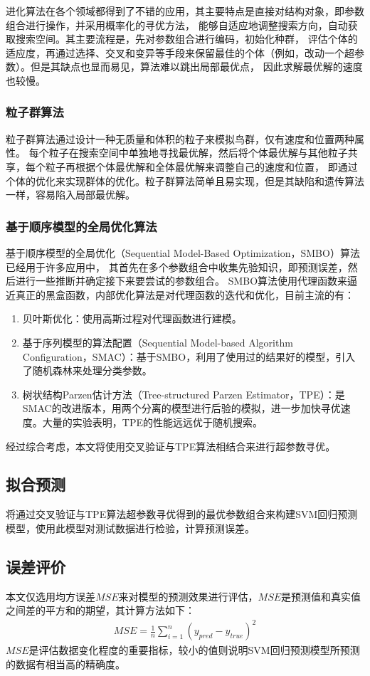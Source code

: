 进化算法在各个领域都得到了不错的应用，其主要特点是直接对结构对象，即参数组合进行操作，并采用概率化的寻优方法，
能够自适应地调整搜索方向，自动获取搜索空间。其主要流程是，先对参数组合进行编码，初始化种群，
评估个体的适应度，再通过选择、交叉和变异等手段来保留最佳的个体（例如，改动一个超参数）。但是其缺点也显而易见，算法难以跳出局部最优点，
因此求解最优解的速度也较慢。

\subsubsection{粒子群算法}

粒子群算法通过设计一种无质量和体积的粒子来模拟鸟群，仅有速度和位置两种属性。
每个粒子在搜索空间中单独地寻找最优解，然后将个体最优解与其他粒子共享，每个粒子再根据个体最优解和全体最优解来调整自己的速度和位置，
即通过个体的优化来实现群体的优化。粒子群算法简单且易实现，但是其缺陷和遗传算法一样，容易陷入局部最优解。

\subsubsection{基于顺序模型的全局优化算法}

基于顺序模型的全局优化（Sequential Model-Based Optimization，SMBO）算法已经用于许多应用中，
其首先在多个参数组合中收集先验知识，即预测误差，然后进行一些推断并确定接下来要尝试的参数组合。
SMBO算法使用代理函数来逼近真正的黑盒函数，内部优化算法是对代理函数的迭代和优化，目前主流的有：
\begin{enumerate}
    \item 贝叶斯优化：使用高斯过程对代理函数进行建模。
    \item 基于序列模型的算法配置（Sequential Model-based Algorithm Configuration，SMAC）：基于SMBO，利用了使用过的结果好的模型，引入了随机森林来处理分类参数。
    \item 树状结构Parzen估计方法（Tree-structured Parzen Estimator，TPE）：是SMAC的改进版本，用两个分离的模型进行后验的模拟，进一步加快寻优速度。大量的实验表明，TPE的性能远远优于随机搜索。
\end{enumerate}

经过综合考虑，本文将使用交叉验证与TPE算法相结合来进行超参数寻优。

\subsection{拟合预测}

将通过交叉验证与TPE算法超参数寻优得到的最优参数组合来构建SVM回归预测模型，使用此模型对测试数据进行检验，计算预测误差。

\subsection{误差评价}

本文仅选用均方误差$MSE$来对模型的预测效果进行评估，$MSE$是预测值和真实值之间差的平方和的期望，其计算方法如下：
\begin{align}
    MSE=\frac{1}{n}\sum_{i=1}^n(y_{pred}-y_{true})^2
\end{align}
$MSE$是评估数据变化程度的重要指标，较小的值则说明SVM回归预测模型所预测的数据有相当高的精确度。